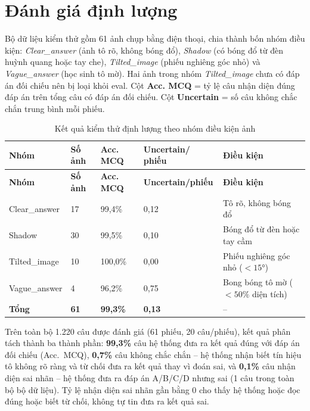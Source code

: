 \section{Đánh giá định lượng}

Bộ dữ liệu kiểm thử gồm 61 ảnh chụp bằng điện thoại, chia thành bốn nhóm điều kiện: \textit{Clear\_answer} (ảnh tô rõ, không bóng đổ), \textit{Shadow} (có bóng đổ từ đèn huỳnh quang hoặc tay che), \textit{Tilted\_image} (phiếu nghiêng góc nhỏ) và \textit{Vague\_answer} (học sinh tô mờ). Hai ảnh trong nhóm \textit{Tilted\_image} chưa có đáp án đối chiếu nên bị loại khỏi eval. Cột \textbf{Acc. MCQ} = tỷ lệ câu nhận diện đúng đáp án trên tổng câu có đáp án đối chiếu. Cột \textbf{Uncertain} = số câu không chắc chắn trung bình mỗi phiếu.

\begin{longtable}{|L{2.8cm}|L{1.4cm}|L{1.8cm}|L{2.5cm}|L{3.5cm}|}
\caption{Kết quả kiểm thử định lượng theo nhóm điều kiện ảnh}
\label{tab:dinh-luong}\\
\hline
\textbf{Nhóm} & \textbf{Số ảnh} & \textbf{Acc. MCQ} & \textbf{Uncertain/ phiếu} & \textbf{Điều kiện} \\
\hline
\endfirsthead
\hline
\textbf{Nhóm} & \textbf{Số ảnh} & \textbf{Acc. MCQ} & \textbf{Uncertain/phiếu} & \textbf{Điều kiện} \\
\hline
\endhead
Clear\_answer   & 17 & 99{,}4\% & 0{,}12 & Tô rõ, không bóng đổ \\
\hline
Shadow          & 30 & 99{,}5\% & 0{,}10 & Bóng đổ từ đèn hoặc tay cầm \\
\hline
Tilted\_image   & 10 & 100{,}0\% & 0{,}00 & Phiếu nghiêng góc nhỏ ($<15°$) \\
\hline
Vague\_answer   &  4 &  96{,}2\% & 0{,}75 & Bong bóng tô mờ ($<50\%$ diện tích) \\
\hline
\textbf{Tổng} & \textbf{61} & \textbf{99{,}3\%} & \textbf{0{,}13} & -- \\
\hline
\end{longtable}

Trên toàn bộ 1.220 câu được đánh giá (61 phiếu, 20 câu/phiếu), kết quả phân tách thành ba thành phần: \textbf{99{,}3\%} câu hệ thống đưa ra kết quả đúng với đáp án đối chiếu (Acc.~MCQ), \textbf{0{,}7\%} câu không chắc chắn -- hệ thống nhận biết tín hiệu tô không rõ ràng và từ chối đưa ra kết quả thay vì đoán sai, và \textbf{0{,}1\%} câu nhận diện sai nhãn -- hệ thống đưa ra đáp án A/B/C/D nhưng sai (1 câu trong toàn bộ bộ dữ liệu). Tỷ lệ nhận diện sai nhãn gần bằng 0 cho thấy hệ thống hoặc đọc đúng hoặc biết từ chối, không tự tin đưa ra kết quả sai.

